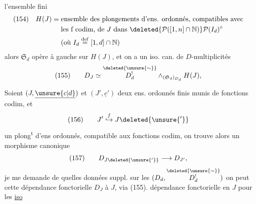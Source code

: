 l'ensemble fini
\[
\begin{aligned}
(154)\quad H(J)={}&\text{ensemble des plongements d'ens. ordonnés, compatibles avec}\\
&\text{les f codim, de }J\text{ dans }\deleted{\mathcal P([1,n]\cap\mathbb N)}\mathcal P(I_d)^\circ\\
&\text{(où }I_d\overset{\mathrm{def}}=[1,d]\cap\mathbb N\text{)}
\end{aligned}
\]
alors $\mathfrak S_d$ opère à gauche sur $H(J)$, et on a un iso. can. de $D$-multiplicités
\[
(155)\qquad D_J\simeq\overset{\deleted{\unsure{\sim}}}{D^!_d}\mathbin{\wedge}_{(\mathfrak S_d)_{D_d}}H(J),
\]

Soient  $(J,\underline{\unsure{c|d}})$ et $(J',\underline{c}')$ deux ens. ordonnés finis munis de fonctions codim, et
\[
(156)\qquad J'\mathrel{\overset{f}{\hookrightarrow}}J\deleted{\unsure{'}}
\]
un plong\textsuperscript{t} d'ens ordonnés, compatible aux fonctions codim, on trouve alors un  morphisme canonique
\[
(157)\qquad D_{J\deleted{\unsure{'}}}\longrightarrow D_{J'},
\]
je me demande  de quelles données suppl.  sur les $(D_d,\overset{\deleted{\unsure{\sim}}}{D^!_d})$ on peut  cette dépendance fonctorielle  $D_J$  à $J$, via (155).   dépendance fonctorielle en $J$ pour les \uline{iso}
